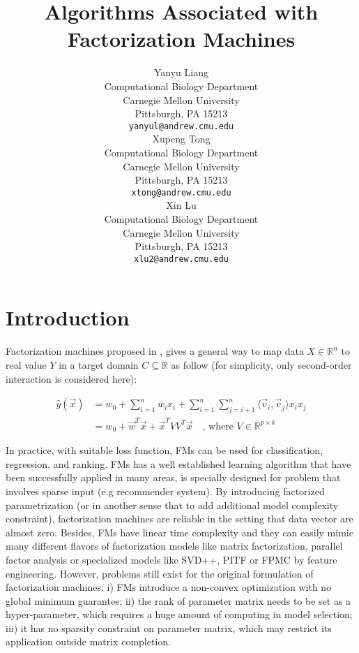 \documentclass{article}
\title{Algorithms Associated with Factorization Machines}
\author{
  Yanyu Liang \\
  Computational Biology Department\\
  Carnegie Mellon University\\
  Pittsburgh, PA 15213 \\
  \texttt{yanyul@andrew.cmu.edu} \\
  \And
  Xupeng Tong \\
  Computational Biology Department\\
  Carnegie Mellon University\\
  Pittsburgh, PA 15213 \\
  \texttt{xtong@andrew.cmu.edu} \\
  \AND
  Xin Lu \\
  Computational Biology Department\\
  Carnegie Mellon University\\
  Pittsburgh, PA 15213 \\
  \texttt{xlu2@andrew.cmu.edu} \\
}
\begin{document}

\maketitle


\section{Introduction}

Factorization machines proposed in \cite{lu1}, gives a general way to map data $X \in \mathbb{R}^n$ to real value $Y$ in a target domain $C \subseteq \mathbb{R}$ as follow (for simplicity, only second-order interaction is considered here): 

\begin{align}
  \hat{y}(\vec{x}) &= w_0 + \sum_{i = 1}^n w_i x_i + \sum_{i = 1}^n \sum_{j = i + 1}^n \langle \vec{v}_i, \vec{v}_j \rangle x_i x_j \nonumber\\
  &= w_0 + \vec{w}^T \vec{x} + \vec{x}^T VV^T \vec{x} \quad\text{, where $V \in \mathbb{R}^{p \times k}$} \nonumber
\end{align}

In practice, with suitable loss function, FMs can be used for classification, regression, and ranking. FMs has a well established learning algorithm that have been successfully applied in many areas, is specially designed for problem that involves sparse input (e.g recommender system). By introducing factorized parametrization (or in another sense that to add additional model complexity constraint), factorization machines are reliable in the setting that data vector are almost zero. Besides, FMs have linear time complexity and they can easily mimic many different flavors of factorization models like matrix factorization, parallel factor analysis or specialized models like SVD++, PITF or FPMC by feature engineering.  However, problems still exist for the original formulation of factorization machines: i) FMs introduce a non-convex optimization with no global minimum guarantee; ii) the rank of parameter matrix needs to be set as a hyper-parameter, which requires a huge amount of computing in model selection; iii) it has no sparsity constraint on parameter matrix, which may restrict its application outside matrix completion.
\end{document}
